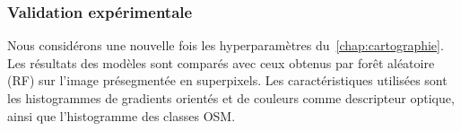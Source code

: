 \subsubsection{Validation expérimentale}
Nous considérons une nouvelle fois les hyperparamètres du~\cref{chap:cartographie}. Les résultats des modèles sont comparés avec ceux obtenus par forêt aléatoire (RF) sur l'image présegmentée en superpixels. Les caractéristiques utilisées sont les histogrammes de gradients orientés et de couleurs comme descripteur optique, ainsi que l'histogramme des classes \gls{OSM}.


